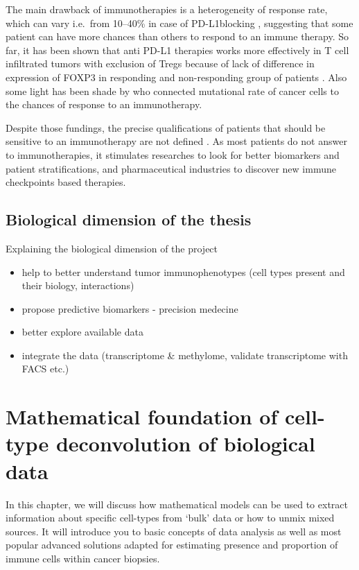 \documentclass[12pt,]{book}
\providecommand{\tightlist}{%
  \setlength{\itemsep}{0pt}\setlength{\parskip}{0pt}}
\theoremstyle{definition}
\theoremstyle{definition}
\theoremstyle{definition}
\theoremstyle{remark}
\begin{document}
The main drawback of immunotherapies is a heterogeneity of response
rate, which can vary i.e.~from 10--40\% in case of PD-L1blocking
\citep{Zou2016}, suggesting that some patient can have more chances than
others to respond to an immune therapy. So far, it has been shown that
anti PD-L1 therapies works more effectively in T cell infiltrated tumors
with exclusion of Tregs because of lack of difference in expression of
FOXP3 in responding and non-responding group of patients
\citep{Herbst2014}. Also some light has been shade by \citet{Rizvi2015}
who connected mutational rate of cancer cells to the chances of response
to an immunotherapy.

Despite those fundings, the precise qualifications of patients that
should be sensitive to an immunotherapy are not defined
\citep{Pitt2016}. As most patients do not answer to immunotherapies, it
stimulates researches to look for better biomarkers and patient
stratifications, and pharmaceutical industries to discover new immune
checkpoints based therapies.

\hypertarget{biological-dimension-of-the-thesis}{%
\section{Biological dimension of the
thesis}\label{biological-dimension-of-the-thesis}}

Explaining the biological dimension of the project

\begin{itemize}
\tightlist
\item
  help to better understand tumor immunophenotypes (cell types present
  and their biology, interactions)
\item
  propose predictive biomarkers - precision medecine
\item
  better explore available data
\item
  integrate the data (transcriptome \& methylome, validate transcriptome
  with FACS etc.)
\end{itemize}

\hypertarget{methods}{%
\chapter{Mathematical foundation of cell-type deconvolution of
biological data}\label{methods}}

In this chapter, we will discuss how mathematical models can be used to
extract information about specific cell-types from `bulk' data or how to
unmix mixed sources. It will introduce you to basic concepts of data
analysis as well as most popular advanced solutions adapted for
estimating presence and proportion of immune cells within cancer
biopsies.
\end{document}

